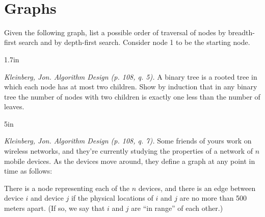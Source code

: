 \documentclass[solutionorbox, answers]{exam}
\begin{document}
\begin{questions}
\begin{parts}
\begin{solutionbox}{}    \vspace{1em}     \\
\end{solutionbox}

\end{parts}


\pagebreak
\section*{Graphs}

\question Given the following graph, list a possible order of traversal of nodes by breadth-first search and by depth-first search. Consider node 1 to be the starting node.

\begin{minipage}{0.3\linewidth}
\end{minipage}
\qquad
\begin{minipage}{0.6\linewidth}
\begin{solutionbox}{1.7in}    \vspace{1em}                                                            \\
\end{solutionbox}
\end{minipage}

\question \textit{Kleinberg, Jon. Algorithm Design (p. 108, q. 5).} A binary tree is a rooted tree in which each node has at most two children. Show by induction that in any binary tree the number of nodes with two children is exactly one less than the number of leaves. 

\nopagebreak

\begin{solutionbox}{5in}    \vspace{1em}                                                            
\end{solutionbox}
\pagebreak
\question \textit{Kleinberg, Jon. Algorithm Design (p. 108, q. 7).} Some friends of yours work on wireless networks, and they're currently studying the properties of a network of $n$ mobile devices. As the devices move around, they define a graph at any point in time as follows: 

{\leftskip=1cm\relax
 \rightskip=1cm\relax
 There is a node representing each of the $n$ devices, and there is an edge between device $i$ and device $j$ if the physical locations of $i$ and $j$ are no more than 500 meters apart. (If so, we say that $i$ and $j$ are “in range” of each other.)
 \par}


\end{questions}
\end{document}
